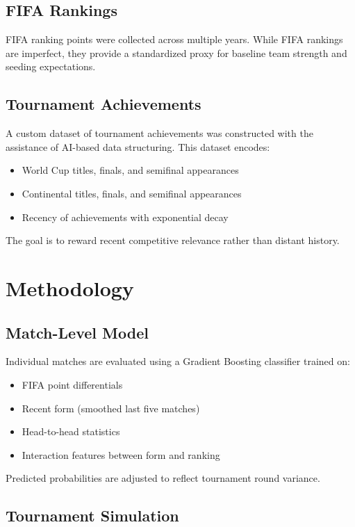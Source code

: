 \documentclass[11pt,a4paper]{article}
\begin{document}
\subsection{FIFA Rankings}

FIFA ranking points were collected across multiple years. While FIFA rankings are imperfect, they provide a standardized proxy for baseline team strength and seeding expectations.

\subsection{Tournament Achievements}

A custom dataset of tournament achievements was constructed with the assistance of AI-based data structuring. This dataset encodes:
\begin{itemize}
    \item World Cup titles, finals, and semifinal appearances
    \item Continental titles, finals, and semifinal appearances
    \item Recency of achievements with exponential decay
\end{itemize}

The goal is to reward recent competitive relevance rather than distant history.

\section{Methodology}

\subsection{Match-Level Model}

Individual matches are evaluated using a Gradient Boosting classifier trained on:
\begin{itemize}
    \item FIFA point differentials
    \item Recent form (smoothed last five matches)
    \item Head-to-head statistics
    \item Interaction features between form and ranking
\end{itemize}

Predicted probabilities are adjusted to reflect tournament round variance.

\subsection{Tournament Simulation}
\end{document}
